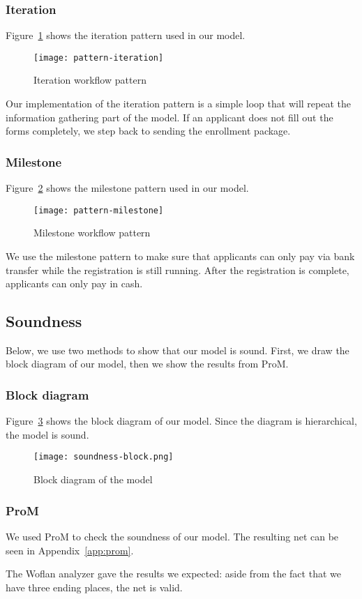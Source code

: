 \subsubsection{Iteration}

	Figure~\ref{fig:patterns:iteration} shows the iteration pattern used in our model.

	\begin{figure}[H]
		\centering
		\texttt{[image: pattern-iteration]}
		\caption{Iteration workflow pattern}
		\label{fig:patterns:iteration}
	\end{figure}

	Our implementation of the iteration pattern is a simple loop that will repeat the information gathering part of the model.
	If an applicant does not fill out the forms completely, we step back to sending the enrollment package.

\subsubsection{Milestone}

	Figure~\ref{fig:patterns:milestone} shows the milestone pattern used in our model.

	\begin{figure}[H]
		\centering
		\texttt{[image: pattern-milestone]}
		\caption{Milestone workflow pattern}
		\label{fig:patterns:milestone}
	\end{figure}

	We use the milestone pattern to make sure that applicants can only pay via bank transfer while the registration is still running.
	After the registration is complete, applicants can only pay in cash.

\subsection{Soundness}

Below, we use two methods to show that our model is sound.
First, we draw the block diagram of our model, then we show the results from ProM.

\subsubsection{Block diagram}

Figure~\ref{fig:soundness:block} shows the block diagram of our model.
Since the diagram is hierarchical, the model is sound.

\begin{figure}[H]
	\centering
	\texttt{[image: soundness-block.png]}
	\caption{Block diagram of the model}
	\label{fig:soundness:block}
\end{figure}

\subsubsection{ProM}

We used ProM to check the soundness of our model.
The resulting net can be seen in Appendix~\ref{app:prom}.

The Woflan analyzer gave the results we expected: aside from the fact that we have three ending places, the net is valid.
